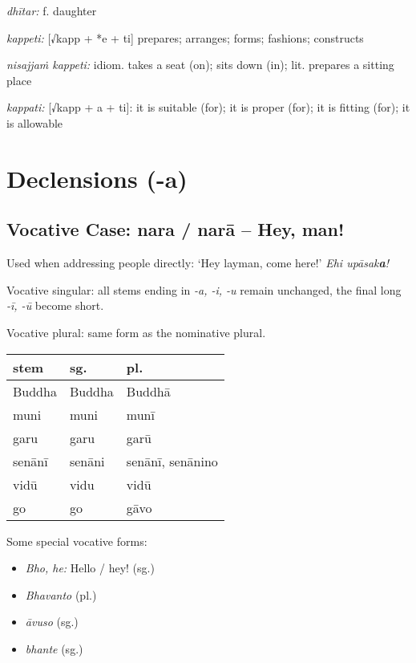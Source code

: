 \documentclass[11pt,oneside]{memoir}
\begin{document}
\normalArrayStrech

\emph{dhītar:} f. daughter

\emph{kappeti:} [√kapp + *e + ti] prepares; arranges; forms; fashions; constructs

\emph{nisajjaṁ kappeti:} idiom. takes a seat (on); sits down (in); lit. prepares a sitting place

\emph{kappati:} [√kapp + a + ti]: it is suitable (for); it is proper (for); it is fitting (for); it is allowable

\clearpage

\section{Declensions (-a)}
\label{sec:orgf8475de}
\subsection{Vocative Case: nara / narā -- Hey, man!}
\label{sec:orgad15dc9}

Used when addressing people directly: `Hey layman, come here!' \emph{Ehi upāsak\textbf{a}!}

Vocative singular: all stems ending in \emph{-a, -i, -u} remain unchanged, the final long \emph{-ī, -ū} become short.

Vocative plural: same form as the nominative plural.

\bigskip
{\centering\par
\begin{multicols}{2}

\begin{center}
\begin{tabular}{lll}
stem & sg. & pl.\\[0pt]
\hline
Buddha & Buddha & Buddhā\\[0pt]
muni & muni & munī\\[0pt]
garu & garu & garū\\[0pt]
senānī & senāni & senānī, senānino\\[0pt]
vidū & vidu & vidū\\[0pt]
go & go & gāvo\\[0pt]
\end{tabular}
\end{center}

\columnbreak

Some special vocative forms:

\begin{itemize}
\item \emph{Bho, he:} Hello / hey! (sg.)
\item \emph{Bhavanto} (pl.)
\item \emph{āvuso} (sg.)
\item \emph{bhante} (sg.)
\end{itemize}

\end{multicols}
\par}
\end{document}
